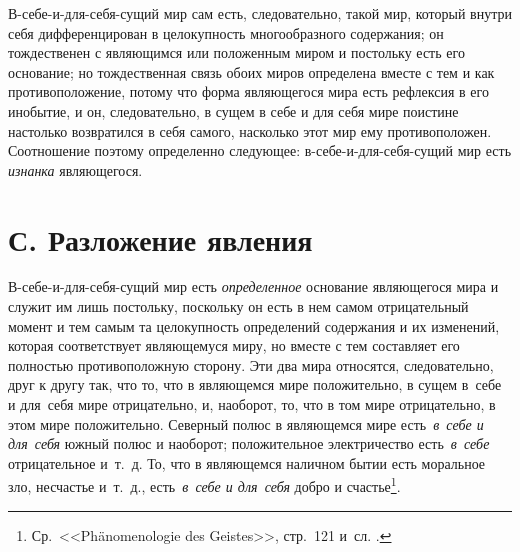 В-себе-и-для-себя-сущий мир сам есть, следовательно, такой мир, который
внутри себя дифференцирован в целокупность многообразного содержания; он
тождественен с являющимся или положенным миром и постольку есть его
основание; но тождественная связь обоих миров определена вместе с тем и как
противоположение, потому что форма являющегося мира есть рефлексия в его
инобытие, и он, следовательно, в сущем в себе и для себя мире поистине
настолько возвратился в себя самого, насколько этот мир ему противоположен.
Соотношение поэтому определенно следующее: в-себе-и-для-себя-сущий мир есть
{\em изнанка} являющегося.


\section[С. Разложение явления]{С. Разложение явления}

В-себе-и-для-себя-сущий мир есть {\em определенное} основание являющегося мира
и служит им лишь постольку, поскольку он есть в нем самом отрицательный момент
и тем самым та целокупность определений содержания и их изменений, которая
соответствует являющемуся миру, но вместе с тем составляет его полностью
противоположную сторону. Эти два мира относятся, следовательно, друг к другу
так, что то, что в являющемся мире положительно, в сущем в~себе и для~себя мире
отрицательно, и, наоборот, то, что в том мире отрицательно, в этом мире
положительно. Северный полюс в являющемся мире есть~{\em в~себе и для~себя}
южный полюс и наоборот; положительное электричество есть~{\em в~себе}
отрицательное и~т.~д. То, что в являющемся наличном бытии есть моральное зло,
несчастье и~т.~д., есть~{\em в~себе и для~себя} добро и
счастье\footnote{Ср.~<<Phäno\-meno\-logie des Geistes>>, стр.~121 и~сл.
.}.

